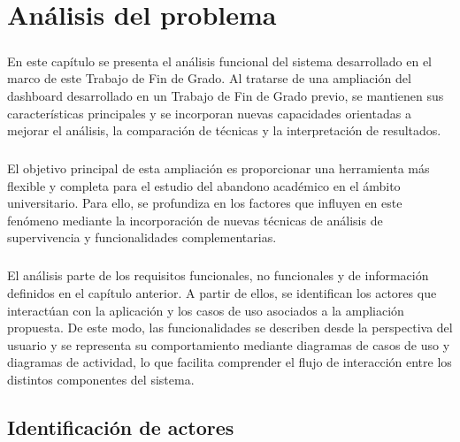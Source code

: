 ﻿\chapter{Análisis del problema}
\label{ch:analisis}
\paragraph*{}En este capítulo se presenta el análisis funcional del sistema desarrollado en el marco de este Trabajo de Fin de Grado. Al tratarse de una ampliación del dashboard desarrollado en un Trabajo de Fin de Grado previo, se mantienen sus características principales y se incorporan nuevas capacidades orientadas a mejorar el análisis, la comparación de técnicas y la interpretación de resultados.

\paragraph*{}El objetivo principal de esta ampliación es proporcionar una herramienta más flexible y completa para el estudio del abandono académico en el ámbito universitario. Para ello, se profundiza en los factores que influyen en este fenómeno mediante la incorporación de nuevas técnicas de análisis de supervivencia y funcionalidades complementarias.

\paragraph*{}El análisis parte de los requisitos funcionales, no funcionales y de información definidos en el capítulo anterior. A partir de ellos, se identifican los actores que interactúan con la aplicación y los casos de uso asociados a la ampliación propuesta. De este modo, las funcionalidades se describen desde la perspectiva del usuario y se representa su comportamiento mediante diagramas de casos de uso y diagramas de actividad, lo que facilita comprender el flujo de interacción entre los distintos componentes del sistema.



\section{Identificación de actores}
